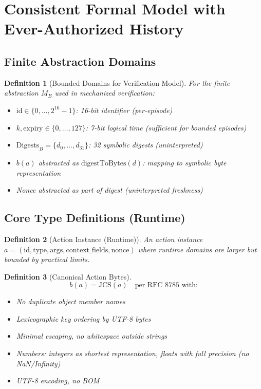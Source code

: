 \documentclass[12pt]{article}
\newtheorem{definition}{Definition}[section]
\begin{document}
\section{Consistent Formal Model with Ever-Authorized History}

\subsection{Finite Abstraction Domains}

\begin{definition}[Bounded Domains for Verification Model]
For the finite abstraction $M_B$ used in mechanized verification:
\begin{itemize}
    \item $\text{id} \in \{0,\dots,2^{16}-1\}$: 16-bit identifier (per-episode)
    \item $k, \text{expiry} \in \{0,\dots,127\}$: 7-bit logical time (sufficient for bounded episodes)
    \item $\mathrm{Digests}_B = \{d_0,\dots,d_{31}\}$: 32 symbolic digests (uninterpreted)
    \item $b(a)$ abstracted as $\mathrm{digestToBytes}(d)$: mapping to symbolic byte representation
    \item Nonce abstracted as part of digest (uninterpreted freshness)
\end{itemize}
\end{definition}

\subsection{Core Type Definitions (Runtime)}

\begin{definition}[Action Instance (Runtime)]
An action instance $a = (\text{id}, \text{type}, \text{args}, \text{context\_fields}, \text{nonce})$ where runtime domains are larger but bounded by practical limits.
\end{definition}

\begin{definition}[Canonical Action Bytes]
\[
b(a) = \mathrm{JCS}(a) \quad \text{per RFC 8785 with:}
\]
\begin{itemize}
    \item No duplicate object member names
    \item Lexicographic key ordering by UTF-8 bytes
    \item Minimal escaping, no whitespace outside strings
    \item Numbers: integers as shortest representation, floats with full precision (no NaN/Infinity)
    \item UTF-8 encoding, no BOM
\end{itemize}
\end{definition}
\end{document}
